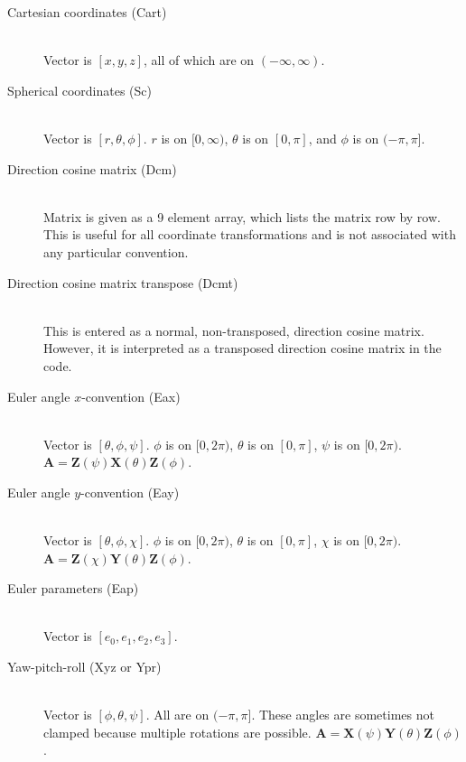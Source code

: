 \documentclass[11pt]{article}
\begin{document}
\begin{description}

\item[Cartesian coordinates (Cart)]
\hfill \\
Vector is $[x,y,z]$, all of which are on $(-\infty,\infty)$.

\item[Spherical coordinates (Sc)]
\hfill \\
Vector is $[r,\theta,\phi]$. $r$ is on $[0,\infty)$, $\theta$ is on $[0,\pi]$, and $\phi$ is on $(-\pi,\pi]$.

\item[Direction cosine matrix (Dcm)]
\hfill \\
Matrix is given as a 9 element array, which lists the matrix row by row. This is useful for all coordinate transformations and is not associated with any particular convention.

\item[Direction cosine matrix transpose (Dcmt)]
\hfill \\
This is entered as a normal, non-transposed, direction cosine matrix. However, it is interpreted as a transposed direction cosine matrix in the code.

\item[Euler angle $x$-convention (Eax)]
\hfill \\
Vector is $[\theta,\phi,\psi]$. $\phi$ is on $[0,2\pi)$, $\theta$ is on $[0,\pi]$, $\psi$ is on $[0,2\pi)$. $\bm{A} = \bm{Z}(\psi)\bm{X}(\theta)\bm{Z}(\phi)$.

\item[Euler angle $y$-convention (Eay)]
\hfill \\
Vector is $[\theta,\phi,\chi]$. $\phi$ is on $[0,2\pi)$, $\theta$ is on $[0,\pi]$, $\chi$ is on $[0,2\pi)$. $\bm{A} = \bm{Z}(\chi)\bm{Y}(\theta)\bm{Z}(\phi)$.

\item[Euler parameters (Eap)]
\hfill \\
Vector is $[e_0,e_1,e_2,e_3]$.

\item[Yaw-pitch-roll (Xyz or Ypr)]
\hfill \\
Vector is $[\phi,\theta,\psi]$. All are on $(-\pi,\pi]$. These angles are sometimes not clamped because multiple rotations are possible. $\bm{A} = \bm{X}(\psi)\bm{Y}(\theta)\bm{Z}(\phi)$.

\end{description}
\end{document}

